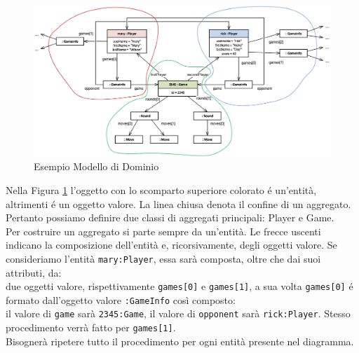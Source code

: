 \begin{figure}[H]
    \begin{center}
        \includegraphics[width=1.05\textwidth]{img/designAggregati}
    \end{center}
\caption{Esempio Modello di Dominio}
    \label{modelloDominio}
\end{figure}
Nella Figura \ref{modelloDominio} l'oggetto con lo scomparto superiore colorato é un'entità, altrimenti
é un oggetto valore. La linea chiusa denota il confine di un aggregato.
Pertanto possiamo definire due classi di aggregati principali: Player e Game.\\
Per costruire un aggregato si parte sempre da un'entità.
Le frecce uscenti indicano la composizione dell'entità e, ricorsivamente, degli oggetti valore.
Se consideriamo l'entità \texttt{mary:Player}, essa sarà composta, oltre che dai suoi attributi, da:\\
due oggetti valore, rispettivamente \texttt{games[0]} e \texttt{games[1]}, a sua volta \texttt{games[0]} é formato dall'oggetto
valore \texttt{:GameInfo} così composto:\\
il valore di \texttt{game} sarà \texttt{2345:Game}, il valore di \texttt{opponent} sarà \texttt{rick:Player}.
Stesso procedimento verrà fatto per \texttt{games[1]}.\\
Bisognerà ripetere tutto il procedimento per ogni entità presente nel diagramma.


